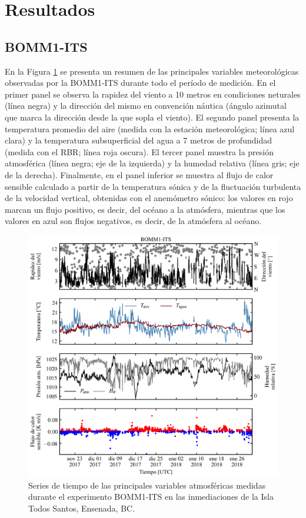 \documentclass[11pt]{article}
\begin{document}

\section{Resultados}
\label{sec:resultados}

\subsection{BOMM1-ITS}
\label{sub:bomm1_its}

En la Figura \ref{fig:bomm1_its_main_variables} se presenta un resumen de las
principales variables meteorológicas observadas por la BOMM1-ITS durante todo el
período de medición. En el primer panel se observa la rapidez del viento a 10
metros en condiciones neturales (línea negra) y la dirección del mismo en
convención náutica (ángulo azimutal que marca la dirección desde la que sopla el
viento). El segundo panel presenta la temperatura promedio del aire (medida con
la estación meteorológica; línea azul clara) y la temperatura subsuperficial del
agua a 7 metros de profundidad (medida con el RBR; línea roja oscura). El tercer
panel muestra la presión atmosférica (línea negra; eje de la izquierda) y la
humedad relativa (línea gris; eje de la derecha). Finalmente, en el panel
inferior se muestra al flujo de calor sensible calculado a partir de la
temperatura sónica y de la fluctuación turbulenta de la velocidad vertical,
obtenidas con el anemómetro sónico: los valores en rojo marcan un flujo
positivo, es decir, del océano a la atmósfera, mientras que los valores en
azul son flujos negativos, es decir, de la atmósfera al océano.

\begin{figure}[htpb]
  \centering
  \includegraphics[width=0.85\linewidth]{../figures/bomm1_its_main_variables.png}
  \caption{
    Series de tiempo de las principales variables atmosféricas medidas durante
    el experimento BOMM1-ITS en las inmediaciones de la Isla Todos Santos,
    Ensenada, BC.
  }
  \label{fig:bomm1_its_main_variables}
\end{figure}
\end{document}
